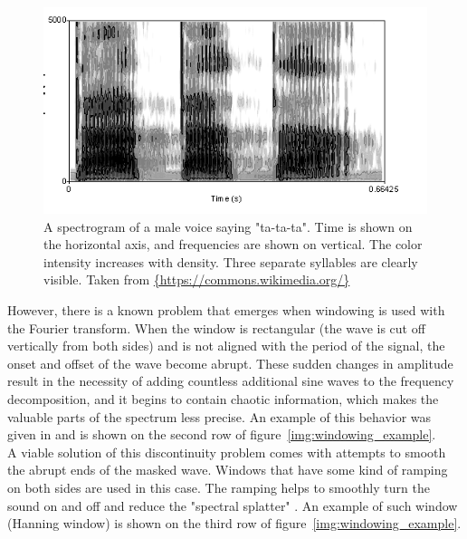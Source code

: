 \begin{figure}[h]
	\centering
	\includegraphics[height=0.25\textheight]{include/spectrogram_example}
	\caption[An example of a spectrogram]{A spectrogram of a male voice saying "ta-ta-ta". Time is shown on the horizontal axis, and frequencies are shown on vertical. The color intensity increases with density. Three separate syllables are clearly visible. Taken from \url{{https://commons.wikimedia.org/}}}
	\label{img:spectrogram_example}
\end{figure}

However, there is a known problem that emerges when windowing is used with the Fourier transform. When the window is rectangular (the wave is cut off vertically from both sides) and is not aligned with the period of the signal, the onset and offset of the wave become abrupt. These sudden changes in amplitude result in the necessity of adding countless additional sine waves to the frequency decomposition, and it begins to contain chaotic information, which makes the valuable parts of the spectrum less precise. An example of this behavior was given in \cite{Schnupp2011} and is shown on the second row of figure~\ref{img:windowing_example}.\\

A viable solution of this discontinuity problem comes with attempts to smooth the abrupt ends of the masked wave. Windows that have some kind of ramping on both sides are used in this case. The ramping helps to smoothly turn the sound on and off and reduce the "spectral splatter" \cite{Schnupp2011}. An example of such window (Hanning window) is shown on the third row of fi\-gure~\ref{img:windowing_example}.

